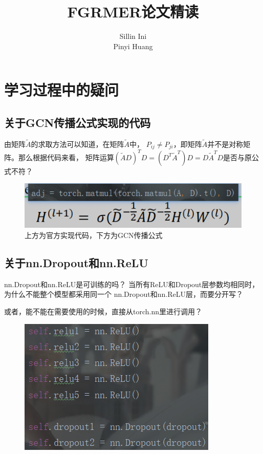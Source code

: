 \documentclass[AutoFakeBold]{MyFormat}
\begin{document}
%
%


\title{{FGRMER论文精读}}
\author{Sillin Ini\\Pinyi Huang}
\maketitle
\thispagestyle{empty}
\newpage

\tableofcontents
\thispagestyle{empty}
\newpage

\mainmatter




\setcounter{chapter}{0}

\chapter{学习过程中的疑问}
\section{关于GCN传播公式实现的代码}
\par 由矩阵$\tilde A$的求取方法可以知道，在矩阵$\tilde A$中，
$P_{ij}\ne P_{ji}$，即矩阵$\tilde A$并不是对称矩阵。那么根据代码来看，
矩阵运算$(\tilde AD)^TD = (D^T\tilde A^T)D = D\tilde A^TD$是否与原公式不符？
\begin{figure}[!h]
    \centering
    \includegraphics[width=0.6\linewidth]{figures/2022.06.05/ques_GCN.png}
    \caption{上方为官方实现代码，下方为GCN传播公式}
\end{figure}

\section{关于nn.Dropout和nn.ReLU}
\par nn.Dropout和nn.ReLU是可训练的吗？
当所有ReLU和Dropout层参数均相同时，为什么不能整个模型都采用同一个
nn.Dropout和nn.ReLU层，而要分开写？
\par 或者，能不能在需要使用的时候，直接从torch.nn里进行调用？
\begin{figure}[!h]
    \centering
    \includegraphics[width=0.4\linewidth]{figures/2022.06.05/ques_relu.png}
\end{figure}
\end{document}
